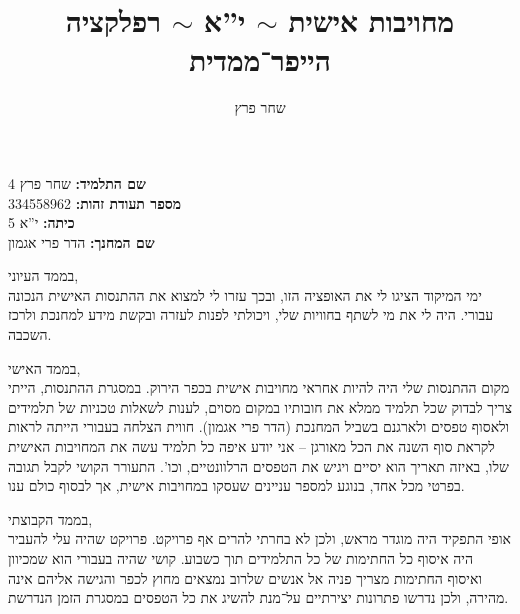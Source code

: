 \documentclass[]{article}
\author{שחר פרץ}
\title{מחויבות אישית $\sim$ י''א $\sim$ רפלקציה הייפר־ממדית}
\begin{document}
	\nonumber
	\onehalfspacing
	
	\maketitle
	
	
	\begin{center}
		\begin{multicols}{4}
			\textbf{שם התלמיד: }שחר פרץ\\
			\textbf{מספר תעודת זהות: }334558962\\
			\textbf{כיתה: }י''א 5\\
			\textbf{שם המחנך: }הדר פרי אגמון
		\end{multicols}
	\end{center}
	
	\large
	
	בממד העיוני, \\
	ימי המיקוד הציגו לי את האופציה הזו, ובכך עזרו לי למצוא את ההתנסות האישית הנכונה עבורי. היה לי את מי לשתף בחוויות שלי, ויכולתי לפנות לעזרה ובקשת מידע למחנכת ולרכז השכבה. 
	
	בממד האישי, \\
	מקום ההתנסות שלי היה להיות אחראי מחויבות אישית בכפר הירוק. במסגרת ההתנסות, הייתי צריך לבדוק שכל תלמיד ממלא את חובותיו במקום מסוים, לענות לשאלות טכניות של תלמידים ולאסוף טפסים ולארגנם בשביל המחנכת (הדר פרי אגמון). חווית הצלחה בעבורי הייתה לראות לקראת סוף השנה את הכל מאורגן – אני יודע איפה כל תלמיד עשה את המחויבות האישית שלו, באיזה תאריך הוא יסיים ויגיש את הטפסים הרלוונטיים, וכו'. התעורר הקושי לקבל תגובה בפרטי מכל אחד, בנוגע למספר עניינים שעסקו במחויבות אישית, אך לבסוף כולם ענו. 
	
	בממד הקבוצתי, \\
	אופי התפקיד היה מוגדר מראש, ולכן לא בחרתי להרים אף פרויקט. פרויקט שהיה עלי להעביר היה איסוף כל החתימות של כל התלמידים תוך כשבוע. קושי שהיה בעבורי הוא שמכיוון ואיסוף החתימות מצריך פניה אל אנשים שלרוב נמצאים מחוץ לכפר והגישה אליהם אינה מהירה, ולכן נדרשו פתרונות יצירתיים על־מנת להשיג את כל הטפסים במסגרת הזמן הנדרשת. 
	
	
	
	\ndoc
	
\end{document}
